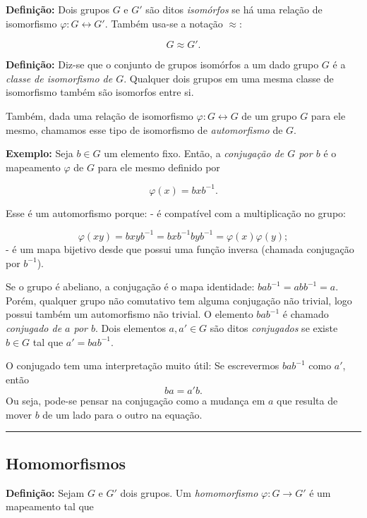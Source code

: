 \documentclass[11pt]{article}
\begin{document}
\textbf{Definição:} Dois grupos \(G\) e \(G'\) são ditos
\emph{isomórfos} se há uma relação de isomorfismo
\(\varphi: G\longleftrightarrow G'\). Também usa-se a notação
\(\approx\):

\[G \approx G'.\]

\textbf{Definição:} Diz-se que o conjunto de grupos isomórfos a um dado
grupo \(G\) é a \emph{classe de isomorfismo de \(G\)}. Qualquer dois
grupos em uma mesma classe de isomorfismo também são isomorfos entre si.

Também, dada uma relação de isomorfismo
\(\varphi: G\longleftrightarrow G\) de um grupo \(G\) para ele mesmo,
chamamos esse tipo de isomorfismo de \emph{automorfismo} de \(G\).

\textbf{Exemplo:} Seja \(b\in G\) um elemento fixo. Então, a
\emph{conjugação de \(G\) por \(b\)} é o mapeamento \(\varphi\) de \(G\)
para ele mesmo definido por

\[\varphi(x) = bxb^{-1}.\]

Esse é um automorfismo porque: - é compatível com a multiplicação no
grupo:

\[\varphi(xy) = bxyb^{-1} = bxb^{-1}byb^{-1} = \varphi(x)\varphi(y);\] -
é um mapa bijetivo desde que possui uma função inversa (chamada
conjugação por \(b^{-1}\)).

Se o grupo é abeliano, a conjugação é o mapa identidade:
\(bab^{ -1} = abb^{-1} = a\). Porém, qualquer grupo não comutativo tem
alguma conjugação não trivial, logo possui também um automorfismo não
trivial. O elemento \(bab^{-1}\) é chamado \emph{conjugado de \(a\) por
\(b\)}. Dois elementos \(a, a'\in G\) são ditos \emph{conjugados} se
existe \(b\in G\) tal que \(a' = bab^{-1}\).

O conjugado tem uma interpretação muito útil: Se escrevermos
\(bab^{-1}\) como \(a'\), então \[ba = a'b.\] Ou seja, pode-se pensar na
conjugação como a mudança em \(a\) que resulta de mover \(b\) de um lado
para o outro na equação.

\begin{center}\rule{0.5\linewidth}{0.5pt}\end{center}

\hypertarget{homomorfismos}{%
\subsection{Homomorfismos}\label{homomorfismos}}

\textbf{Definição:} Sejam \(G\) e \(G'\) dois grupos. Um
\emph{homomorfismo} \(\varphi: G\longrightarrow G'\) é um mapeamento tal
que
\end{document}
